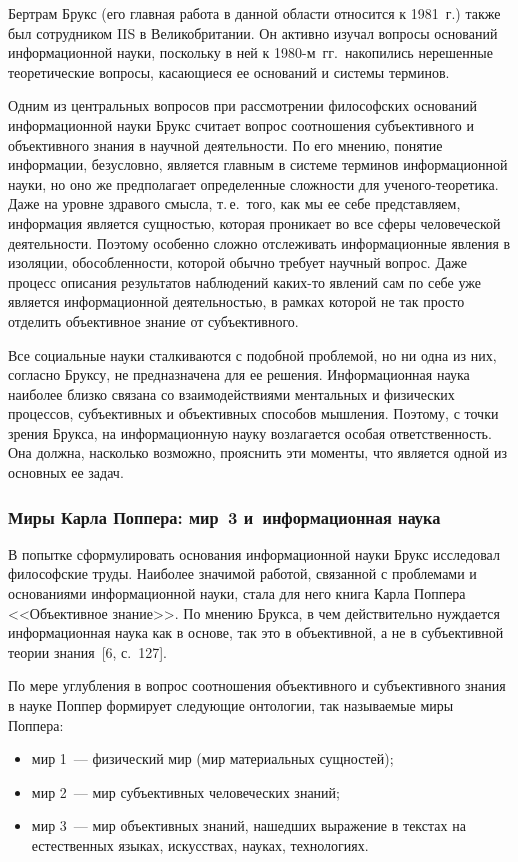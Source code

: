 \begin{multicols}{2}
      Бертрам Брукс (его главная работа в данной области относится к 1981~г.) также был
сотрудником IIS в Великобритании. Он активно \mbox{изучал} вопросы оснований информационной
науки, поскольку в ней к 1980-м~гг.\ накопились нерешенные теоретические вопросы,
касающиеся ее оснований и системы терминов.

      Одним из центральных вопросов при рас\-смот\-ре\-нии философских оснований
информационной науки Брукс считает вопрос соотношения субъективного и объективного
знания в научной деятельности. По его мнению, понятие информации, безусловно, является
главным в системе терминов информационной науки, но оно же предполагает определенные
сложности для ученого-теоретика. Даже на уровне здравого смысла, т.\,е.\ того, как мы ее себе
представляем, информация является сущностью, которая проникает во все сферы человеческой
деятельности. Поэтому особенно сложно отслеживать информационные явления в изоляции,
обособленности, которой обычно требует научный вопрос. Даже процесс описания результатов
наблюдений каких-то явлений сам по себе уже является информационной деятельностью, в
рамках которой не так просто отделить объективное знание от субъективного.

      Все социальные науки сталкиваются с подобной проблемой, но ни одна из них, согласно
Бруксу, не предназначена для ее решения. Информационная наука наиболее близко связана со
взаимодействиями ментальных и физических процессов, субъективных и объективных
способов мышления. Поэтому, с точки зрения Брукса, на информационную науку возлагается
особая ответственность. Она должна, насколько возможно, прояснить эти моменты, что
является одной из основных ее задач.

\subsubsection{Миры Карла Поппера: мир~3 и~информационная наука} %

      В попытке сформулировать основания информационной науки Брукс исследовал
философские труды. Наиболее значимой работой, связанной с проблемами и основаниями
информационной науки, стала для него книга Карла Поппера <<Объективное знание>>. По
мнению Брукса, в чем действительно нуждается информационная наука как в основе, так это в
объективной, а не в субъективной теории знания~[6, с.~127].

      По мере углубления в вопрос соотношения объективного и субъективного знания в
науке Поппер формирует следующие онтологии, так называемые миры Поппера:
      \begin{itemize}
\item мир 1~--- физический мир (мир материальных сущностей);
\item мир 2~--- мир субъективных человеческих знаний;
\item мир 3~--- мир объективных знаний, нашедших выражение в текстах на естественных
языках, искусствах, науках, технологиях.
\end{itemize}


\end{multicols}
